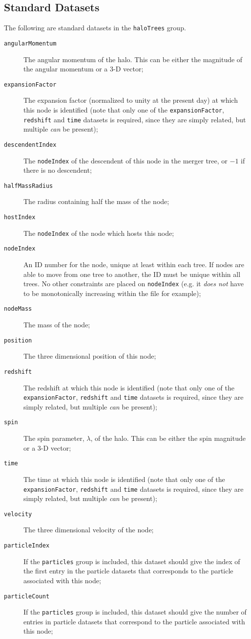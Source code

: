 \subsection{Standard Datasets}

The following are standard datasets in the {\tt haloTrees} group.

\begin{description}
 \item [{\tt angularMomentum}] The angular momentum of the halo. This can be either the magnitude of the angular momentum or a 3-D vector;
 \item [{\tt expansionFactor}] The expansion factor (normalized to unity at the present day) at which this node is identified (note that only one of the {\tt expansionFactor}, {\tt redshift} and {\tt time} datasets is required, since they are simply related, but multiple \emph{can} be present);
 \item [{\tt descendentIndex}] The {\tt nodeIndex} of the descendent of this node in the merger tree, or $-1$ if there is no descendent;
 \item [{\tt halfMassRadius}] The radius containing half the mass of the node;
 \item [{\tt hostIndex}] The {\tt nodeIndex} of the node which hosts this node;
 \item [{\tt nodeIndex}] An ID number for the node, unique at least within each tree. If nodes are able to move from one tree to another, the ID must be unique within all trees. No other constraints are placed on {\tt nodeIndex} (e.g. it \emph{does not} have to be monotonically increasing within the file for example);
 \item [{\tt nodeMass}] The mass of the node;
 \item [{\tt position}] The three dimensional position of this node;
 \item [{\tt redshift}] The redshift at which this node is identified (note that only one of the {\tt expansionFactor}, {\tt redshift} and {\tt time} datasets is required, since they are simply related, but multiple \emph{can} be present);
 \item [{\tt spin}] The spin parameter, $\lambda$, of the halo. This can be either the spin magnitude or a 3-D vector;
 \item [{\tt time}] The time at which this node is identified (note that only one of the {\tt expansionFactor}, {\tt redshift} and {\tt time} datasets is required, since they are simply related, but multiple \emph{can} be present);
 \item [{\tt velocity}] The three dimensional velocity of the node;
 \item [{\tt particleIndex}] If the {\tt particles} group is included, this dataset should give the index of the first entry in the particle datasets that corresponds to the particle associated with this node;
 \item [{\tt particleCount}] If the {\tt particles} group is included, this dataset should give the number of entries in particle datasets that correspond to the particle associated with this node;
\end{description}


